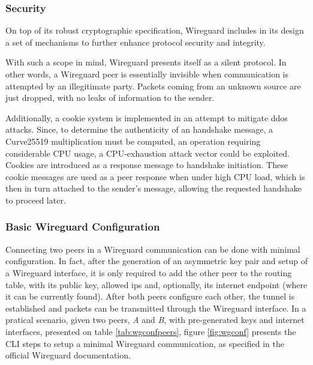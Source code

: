 \documentclass[11pt,twoside,a4paper]{report}
\begin{document}
\subsubsection{Security}

On top of its robust cryptographic specification, Wireguard includes in its design a set of mechanisms to further enhance protocol security and integrity.

With such a scope in mind, Wireguard presents itself as a silent protocol. In other words, a Wireguard peer is essentially invisible when communication is attempted by an illegitimate party. Packets coming from an unknown source are just dropped, with no leaks of information to the sender.

Additionally, a cookie system is implemented in an attempt to mitigate \ac{ddos} attacks. Since, to determine the authenticity of an handshake message, a Curve25519 multiplication must be computed,  an operation requiring considerable CPU usage, a CPU-exhaustion attack vector could be exploited. Cookies are introduced as a response message to handshake initiation. These cookie messages are used as a peer response when under high CPU load, which is then in turn attached to the sender's message, allowing the requested handshake to proceed later.


\subsubsection{Basic Wireguard Configuration}

Connecting two peers in a Wireguard communication can be done with minimal configuration. In fact, after the generation of an asymmetric key pair and setup of a Wireguard interface, it is only required to add the other peer to the routing table, with its public key, allowed ips and, optionally, its internet endpoint (where it can be currently found). After both peers configure each other, the tunnel is established and packets can be transmitted through the Wireguard interface.
In a pratical scenario, given two peers, \emph{A} and \emph{B}, with pre-generated keys and internet interfaces, presented on table \ref{tab:wgconfpeers}, figure \ref{fig:wgconf} presents the CLI steps to setup a minimal Wireguard communication, as specified in the official Wireguard documentation.
\end{document}
